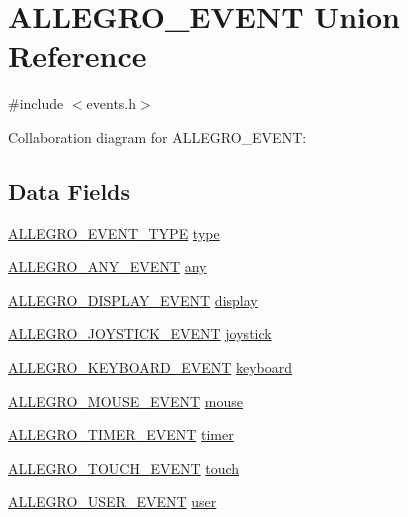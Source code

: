 \hypertarget{union_a_l_l_e_g_r_o___e_v_e_n_t}{}\section{A\+L\+L\+E\+G\+R\+O\+\_\+\+E\+V\+E\+NT Union Reference}
\label{union_a_l_l_e_g_r_o___e_v_e_n_t}


{\ttfamily \#include $<$events.\+h$>$}



Collaboration diagram for A\+L\+L\+E\+G\+R\+O\+\_\+\+E\+V\+E\+NT\+:
\subsection*{Data Fields}
\begin{DoxyCompactItemize}
\item 
\hyperlink{events_8h_adb888c90ea2fb98666e07eff730fd284}{A\+L\+L\+E\+G\+R\+O\+\_\+\+E\+V\+E\+N\+T\+\_\+\+T\+Y\+PE} \hyperlink{union_a_l_l_e_g_r_o___e_v_e_n_t_a0f6695598fd63039c806386a91cfc9f4}{type}
\item 
\hyperlink{struct_a_l_l_e_g_r_o___a_n_y___e_v_e_n_t}{A\+L\+L\+E\+G\+R\+O\+\_\+\+A\+N\+Y\+\_\+\+E\+V\+E\+NT} \hyperlink{union_a_l_l_e_g_r_o___e_v_e_n_t_a3b441e9b7b1c0ed11978a763ed8998b9}{any}
\item 
\hyperlink{struct_a_l_l_e_g_r_o___d_i_s_p_l_a_y___e_v_e_n_t}{A\+L\+L\+E\+G\+R\+O\+\_\+\+D\+I\+S\+P\+L\+A\+Y\+\_\+\+E\+V\+E\+NT} \hyperlink{union_a_l_l_e_g_r_o___e_v_e_n_t_a4b527b4fef7a56a51d0d24df71ee846f}{display}
\item 
\hyperlink{struct_a_l_l_e_g_r_o___j_o_y_s_t_i_c_k___e_v_e_n_t}{A\+L\+L\+E\+G\+R\+O\+\_\+\+J\+O\+Y\+S\+T\+I\+C\+K\+\_\+\+E\+V\+E\+NT} \hyperlink{union_a_l_l_e_g_r_o___e_v_e_n_t_a70b7205501aaeb4dfb134aba40829a2b}{joystick}
\item 
\hyperlink{struct_a_l_l_e_g_r_o___k_e_y_b_o_a_r_d___e_v_e_n_t}{A\+L\+L\+E\+G\+R\+O\+\_\+\+K\+E\+Y\+B\+O\+A\+R\+D\+\_\+\+E\+V\+E\+NT} \hyperlink{union_a_l_l_e_g_r_o___e_v_e_n_t_a109c3950e618a6925255cc1eafd5c91f}{keyboard}
\item 
\hyperlink{struct_a_l_l_e_g_r_o___m_o_u_s_e___e_v_e_n_t}{A\+L\+L\+E\+G\+R\+O\+\_\+\+M\+O\+U\+S\+E\+\_\+\+E\+V\+E\+NT} \hyperlink{union_a_l_l_e_g_r_o___e_v_e_n_t_a58d706041059943b1fb4b5eb8b6acf06}{mouse}
\item 
\hyperlink{struct_a_l_l_e_g_r_o___t_i_m_e_r___e_v_e_n_t}{A\+L\+L\+E\+G\+R\+O\+\_\+\+T\+I\+M\+E\+R\+\_\+\+E\+V\+E\+NT} \hyperlink{union_a_l_l_e_g_r_o___e_v_e_n_t_a095cff27a0b3379589e79842e491a00a}{timer}
\item 
\hyperlink{struct_a_l_l_e_g_r_o___t_o_u_c_h___e_v_e_n_t}{A\+L\+L\+E\+G\+R\+O\+\_\+\+T\+O\+U\+C\+H\+\_\+\+E\+V\+E\+NT} \hyperlink{union_a_l_l_e_g_r_o___e_v_e_n_t_aa7ff3870920cf6d19345114c67f2ef90}{touch}
\item 
\hyperlink{struct_a_l_l_e_g_r_o___u_s_e_r___e_v_e_n_t}{A\+L\+L\+E\+G\+R\+O\+\_\+\+U\+S\+E\+R\+\_\+\+E\+V\+E\+NT} \hyperlink{union_a_l_l_e_g_r_o___e_v_e_n_t_aa332ac2bdad5865354e4a20c982c86f7}{user}
\end{DoxyCompactItemize}


